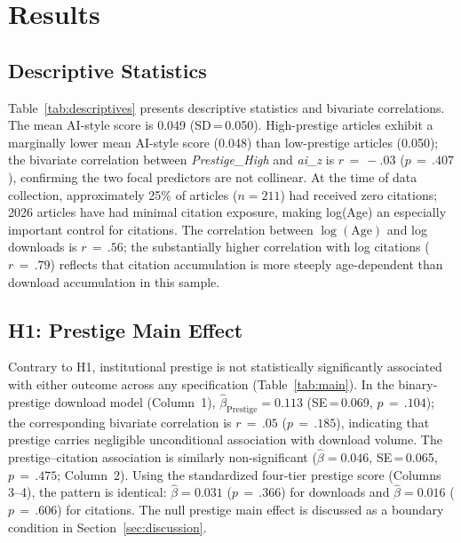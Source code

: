 \documentclass[12pt,a4paper]{article}
\begin{document}
\section{Results}
\label{sec:results}

\subsection{Descriptive Statistics}

Table~\ref{tab:descriptives} presents descriptive statistics and
bivariate correlations.
The mean AI-style score is 0.049 (SD\,=\,0.050).
High-prestige articles exhibit a marginally lower mean AI-style score
(0.048) than low-prestige articles (0.050); the bivariate correlation
between \textit{Prestige\_High} and \textit{ai\_z} is $r\,=\,{-}.03$
($p\,=\,.407$), confirming the two focal predictors are not collinear.
At the time of data collection, approximately 25\% of articles ($n = 211$)
had received zero citations; 2026 articles have had minimal citation
exposure, making log(Age) an especially important control for citations.
The correlation between $\log(\text{Age})$ and log downloads is
$r\,=\,.56$; the substantially higher correlation with log citations
($r\,=\,.79$) reflects that citation accumulation is more steeply
age-dependent than download accumulation in this sample.

\subsection{H1: Prestige Main Effect}

Contrary to H1, institutional prestige is not statistically significantly
associated with either outcome across any specification
(Table~\ref{tab:main}).
In the binary-prestige download model (Column~1),
$\hat{\beta}_{\text{Prestige}} = 0.113$ (SE\,=\,0.069, $p\,=\,.104$);
the corresponding bivariate correlation is $r\,=\,.05$ ($p\,=\,.185$),
indicating that prestige carries negligible unconditional association
with download volume.
The prestige--citation association is similarly non-significant
($\hat{\beta} = 0.046$, SE\,=\,0.065, $p\,=\,.475$; Column~2).
Using the standardized four-tier prestige score (Columns 3--4),
the pattern is identical: $\hat{\beta} = 0.031$ ($p\,=\,.366$) for
downloads and $\hat{\beta} = 0.016$ ($p\,=\,.606$) for citations.
The null prestige main effect is discussed as a boundary condition in
Section~\ref{sec:discussion}.
\end{document}
